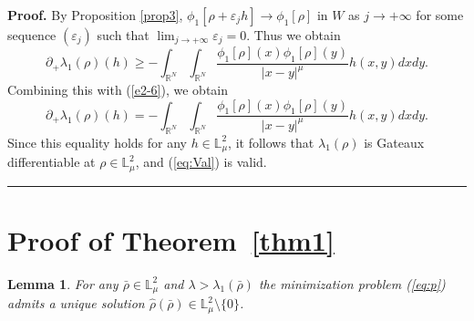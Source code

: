 \documentclass[12pt,thmsa]{article}
\newtheorem{lemma}[theorem]{Lemma}
\newenvironment{proof}[1][Proof]{\noindent\textbf{#1.} }{\ \rule{0.5em}{0.5em}}
\begin{document}
\begin{proof}
By Proposition \ref{prop3}, $\phi _{1}[\rho +\varepsilon _{j}h]\rightarrow
\phi _{1}[\rho ]$ in $W$ as $j\rightarrow +\infty $ for some sequence $%
(\varepsilon _{j})$ such that $\lim_{j\rightarrow +\infty }\varepsilon
_{j}=0 $. Thus we obtain
\begin{equation*}
\partial _{+}\lambda _{1}(\rho )(h)\geq -\int_{\mathbb{R}^{N}}\int_{\mathbb{R%
}^{N}}\frac{\phi _{1}[\rho ](x)\phi _{1}[\rho ](y)}{|x-y|^{\mu }}h(x,y)dxdy.
\end{equation*}%
Combining this with (\ref{e2-6}), we obtain
\begin{equation*}
\partial _{+}\lambda _{1}(\rho )(h)=-\int_{\mathbb{R}^{N}}\int_{\mathbb{R}%
^{N}}\frac{\phi _{1}[\rho ](x)\phi _{1}[\rho ](y)}{|x-y|^{\mu }}h(x,y)dxdy.
\end{equation*}%
Since this equality holds for any $h\in \mathbb{L}_{\mu }^{2}$, it follows
that $\lambda _{1}(\rho )$ is Gateaux differentiable at $\rho \in \mathbb{L}%
_{\mu }^{2}$, and (\ref{eq:Val}) is valid.
\end{proof}

\section{Proof of Theorem~\protect\ref{thm1}}

\begin{lemma}
\label{lem1} For any $\bar{\rho}\in \mathbb{L}_{\mu }^{2}$ and $\lambda
>\lambda _{1}(\bar{\rho})$ the minimization problem (\ref{eq:p}) admits a
unique solution $\hat{\rho}(\bar{\rho})\in \mathbb{L}_{\mu }^{2}\setminus
\{0\}$.
\end{lemma}
\end{document}
